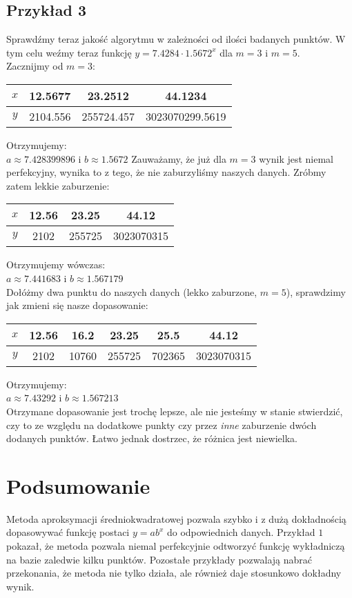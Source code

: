 \documentclass[12pt,a4paper]{article}
\begin{document}
\subsection{Przykład 3}
Sprawdźmy teraz jakość algorytmu w zależności od ilości badanych punktów. W tym celu weźmy teraz funkcję $y = 7.4284 \cdot 1.5672^x$ dla $m=3$ i $m=5$.\\ 
Zacznijmy od $m=3$:\\
\begin{center}
	\begin{tabular}{|c|c|c|c|} \hline
	$x$ & 12.5677 & 23.2512  & 44.1234 \\ \hline
	$y$ & 2104.556 & 255724.457 & 3023070299.5619  \\ \hline
	\end{tabular}
\end{center}
Otrzymujemy:\\
$a \approx 7.428399896$ i $b \approx 1.5672$
Zauważamy, że już dla $m=3$ wynik jest niemal perfekcyjny, wynika to z tego, że nie zaburzyliśmy naszych danych. Zróbmy zatem lekkie zaburzenie:\\
\begin{center}
	\begin{tabular}{|c|c|c|c|} \hline
	$x$ & 12.56 & 23.25  & 44.12 \\ \hline
	$y$ & 2102 & 255725 & 3023070315  \\ \hline
	\end{tabular}
\end{center}
Otrzymujemy wówczas:\\
$a \approx 7.441683$ i $b \approx 1.567179$\\
Dołóżmy dwa punktu do naszych danych (lekko zaburzone, $m=5$), sprawdzimy jak zmieni się nasze dopasowanie:\\
\begin{center}
	\begin{tabular}{|c|c|c|c|c|c|} \hline
	$x$ & 12.56 & 16.2 & 23.25 & 25.5 & 44.12 \\ \hline
	$y$ & 2102 & 10760 & 255725 & 702365 & 3023070315  \\ \hline
	\end{tabular}
\end{center}
Otrzymujemy:\\
$a \approx 7.43292$ i $b \approx 1.567213$\\
Otrzymane dopasowanie jest trochę lepsze, ale nie jesteśmy w stanie stwierdzić, czy to ze względu na dodatkowe punkty czy przez \textit{inne} zaburzenie dwóch dodanych punktów. Łatwo jednak dostrzec, że różnica jest niewielka.
\section{Podsumowanie}
Metoda aproksymacji średniokwadratowej pozwala szybko i z dużą dokładnością dopasowywać funkcję postaci $y=ab^x$ do odpowiednich danych. Przykład $1$ pokazał, że metoda pozwala niemal perfekcyjnie odtworzyć funkcję wykładniczą na bazie zaledwie kilku punktów. Pozostałe przykłady pozwalają nabrać przekonania, że metoda nie tylko działa, ale również daje stosunkowo dokładny wynik.
\end{document}
